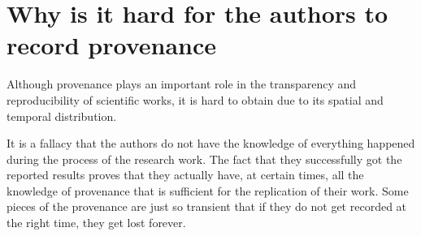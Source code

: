 \section{Why is it hard for the authors to record provenance}
Although provenance plays an important role in the transparency and reproducibility of scientific 
works, it is hard to obtain due to its spatial and temporal distribution.

It is a fallacy that the authors do not have the knowledge of everything happened during the process 
of the research work. The fact that they successfully got the reported results proves that they 
actually have, at certain times, all the knowledge of provenance that is sufficient for the 
replication of their work. Some pieces of the provenance are just so transient that if they do not 
get recorded at the right time, they get lost forever.


